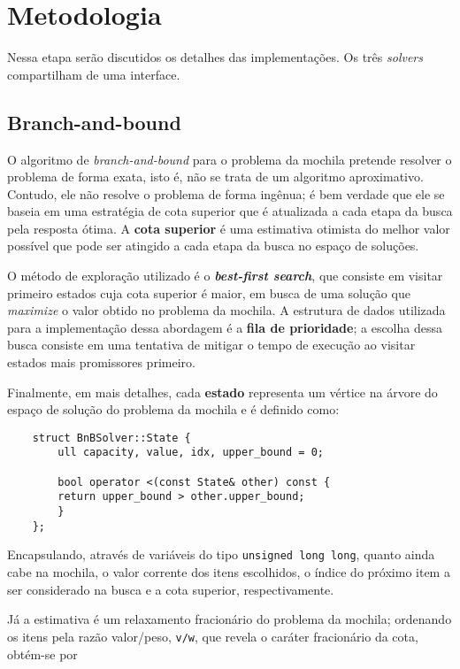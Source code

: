\documentclass[12pt]{article}
\begin{document}
\newpage

\section{Metodologia} 

Nessa etapa serão discutidos os detalhes das implementações. Os três \textit{solvers} compartilham de uma interface.

\subsection{Branch-and-bound}

O algoritmo de \textit{branch-and-bound} para o problema da mochila pretende resolver o problema de forma exata, isto é, não se trata de um algoritmo aproximativo. Contudo, ele não resolve o problema de forma ingênua; é bem verdade que ele se baseia em uma estratégia de cota superior que é atualizada a cada etapa da busca pela resposta ótima. A \textbf{cota superior} é uma estimativa otimista do melhor valor possível que pode ser atingido a cada etapa da busca no espaço de soluções.

O método de exploração utilizado é o \textit{\textbf{best-first search}}, que consiste em visitar primeiro estados cuja cota superior é maior, em busca de uma solução que \textit{maximize} o valor obtido no problema da mochila. A estrutura de dados utilizada para a implementação dessa abordagem é a \textbf{fila de prioridade}; a escolha dessa busca consiste em uma tentativa de mitigar o tempo de execução ao visitar estados mais promissores primeiro.

Finalmente, em mais detalhes, cada \textbf{estado} representa um vértice na árvore do espaço de solução do problema da mochila e é definido como:

\begin{verbatim}
    struct BnBSolver::State { 
        ull capacity, value, idx, upper_bound = 0;

        bool operator <(const State& other) const {
        return upper_bound > other.upper_bound;
        }
    };    
\end{verbatim}

Encapsulando, através de variáveis do tipo \texttt{unsigned long long}, quanto ainda cabe na mochila, o valor corrente dos itens escolhidos, o índice do próximo item a ser considerado na busca e a cota superior, respectivamente.

Já a estimativa é um relaxamento fracionário do problema da mochila; ordenando os itens pela razão valor/peso, \texttt{v/w}, que revela o caráter fracionário da cota, obtém-se por
\end{document}
